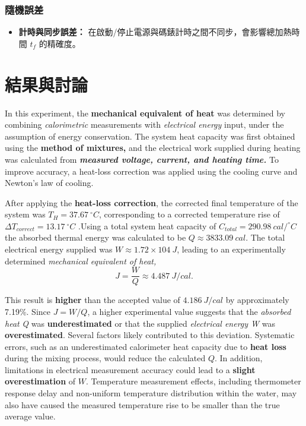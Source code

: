 \documentclass[12pt]{article}
\begin{document}
\subsubsection{隨機誤差}
\begin{itemize}
    \item \textbf{計時與同步誤差：} 在啟動/停止電源與碼錶計時之間不同步，會影響總加熱時間 $t_f$ 的精確度。
\end{itemize}

\newpage
\section{\textbf{結果與討論}}
In this experiment, the\textbf{ mechanical equivalent of heat }was determined by combining \textit{calorimetric} measurements with \textit{electrical energy} input, under the assumption of energy conservation. The system heat capacity was first obtained using the \textbf{method of mixtures,} and the electrical work supplied during heating was calculated from\textit{\textbf{ measured voltage, current, and heating time.}} To improve accuracy, a heat-loss correction was applied using the cooling curve and Newton’s law of cooling.

\vspace{0.3cm}
After applying the \textbf{heat-loss correction}, the corrected final temperature of the system was $T_H=37.67\ ^∘C$, corresponding to a corrected temperature rise of $\Delta T_{correct}=13.17\ ^ \circ C$ .Using a total system heat capacity of $C_{total}=290.98\  cal/^\circ C \,$ the absorbed thermal energy was calculated to be $Q\approx3833.09\ cal.$ The total electrical energy supplied was $ W\approx1.72×104\ J$, leading to an experimentally determined \textit{mechanical equivalent of heat,}
\vspace{0.3cm}
\[J=\frac{W}{Q}\approx 4.487\ J/cal.\]

\vspace{0.3cm}
This result is \textbf{higher} than the accepted value of $4.186 \ J/cal$ by approximately 7.19\%. Since $ J=W/Q$, a higher experimental value suggests that the\textit{ absorbed heat} \textit{Q} was \textbf{underestimated} or that the supplied \textit{electrical energy W} was \textbf{overestimated}. Several factors likely contributed to this deviation. Systematic errors, such as an underestimated calorimeter heat capacity due to \textbf{heat loss} during the mixing process, would reduce the calculated $Q$. In addition, limitations in electrical measurement accuracy could lead to a \textbf{slight overestimation} of $W$. Temperature measurement effects, including thermometer response delay and non-uniform temperature distribution within the water, may also have caused the measured temperature rise to be smaller than the true average value. 
\end{document}
